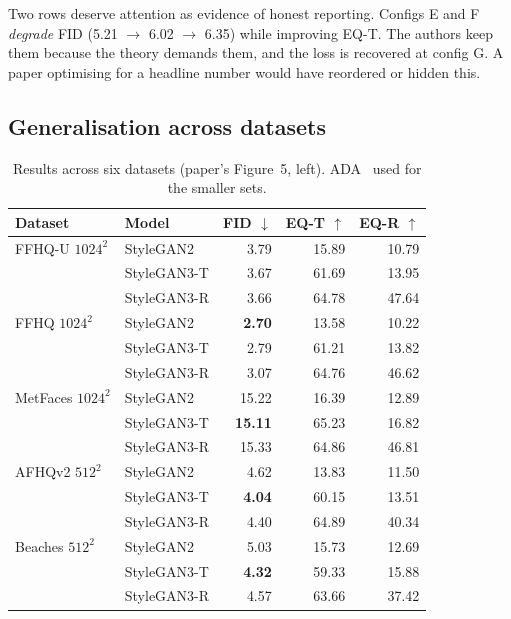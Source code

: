 \documentclass[11pt,a4paper]{article}
\begin{document}
Two rows deserve attention as evidence of honest reporting. Configs E and F
\emph{degrade} FID (5.21 $\to$ 6.02 $\to$ 6.35) while improving EQ-T. The authors
keep them because the theory demands them, and the loss is recovered at config G.
A paper optimising for a headline number would have reordered or hidden this.

\subsection{Generalisation across datasets}

\begin{table}[htbp]
\centering
\caption{Results across six datasets (paper's Figure~5, left). ADA~\citep{karras2020ada}
used for the smaller sets.}
\label{tab:datasets}
\small
\begin{tabular}{llrrr}
\toprule
\textbf{Dataset} & \textbf{Model} & \textbf{FID} $\downarrow$ & \textbf{EQ-T} $\uparrow$ & \textbf{EQ-R} $\uparrow$ \\
\midrule
\multirow{1}{*}{FFHQ-U $1024^2$}
 & StyleGAN2      & 3.79 & 15.89 & 10.79 \\
 & StyleGAN3-T    & 3.67 & 61.69 & 13.95 \\
 & StyleGAN3-R    & 3.66 & 64.78 & 47.64 \\
\midrule
FFHQ $1024^2$
 & StyleGAN2      & \textbf{2.70} & 13.58 & 10.22 \\
 & StyleGAN3-T    & 2.79 & 61.21 & 13.82 \\
 & StyleGAN3-R    & 3.07 & 64.76 & 46.62 \\
\midrule
MetFaces $1024^2$
 & StyleGAN2      & 15.22 & 16.39 & 12.89 \\
 & StyleGAN3-T    & \textbf{15.11} & 65.23 & 16.82 \\
 & StyleGAN3-R    & 15.33 & 64.86 & 46.81 \\
\midrule
AFHQv2 $512^2$
 & StyleGAN2      & 4.62 & 13.83 & 11.50 \\
 & StyleGAN3-T    & \textbf{4.04} & 60.15 & 13.51 \\
 & StyleGAN3-R    & 4.40 & 64.89 & 40.34 \\
\midrule
Beaches $512^2$
 & StyleGAN2      & 5.03 & 15.73 & 12.69 \\
 & StyleGAN3-T    & \textbf{4.32} & 59.33 & 15.88 \\
 & StyleGAN3-R    & 4.57 & 63.66 & 37.42 \\
\bottomrule
\end{tabular}
\end{table}
\end{document}
